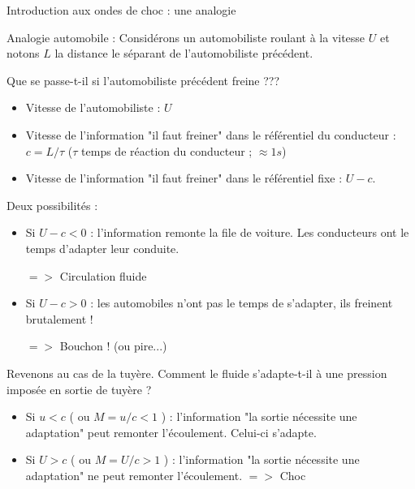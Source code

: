 \begin{frame}{Introduction aux ondes de choc : une analogie}

\small

Analogie automobile :
 \smallskip
Considérons un automobiliste roulant à la vitesse $U$ et notons  $L$ la distance le séparant de l'automobiliste précédent.

 \smallskip
Que se passe-t-il si l'automobiliste précédent freine  ???

 \pause 
 \smallskip

\begin{itemize}
\item Vitesse de l'automobiliste : $U$

\item Vitesse de l'information "il faut freiner" dans le référentiel du conducteur : $c = L/\tau$ ($\tau$ temps de réaction du conducteur ; $\approx 1 s$)

\item Vitesse de l'information "il faut freiner" dans le référentiel fixe : $U-c$.

\end{itemize}

Deux possibilités :

\begin{itemize}
\item Si $U-c<0$ : l'information remonte la file de voiture. Les conducteurs ont le temps d'adapter leur conduite.

$=>$ Circulation fluide 

\pause
\item Si $U-c>0$ : les automobiles n'ont pas le temps de s'adapter, ils freinent brutalement !

$=>$ Bouchon ! (ou pire...)

\end{itemize}

\pause


Revenons au cas de la tuyère. Comment le fluide s'adapte-t-il à une pression imposée en sortie de tuyère ?
\pause
\begin{itemize}
\item Si $u<c$ ( ou $M = u/c <1$ ) : l'information "la sortie nécessite une adaptation" peut remonter l'écoulement. Celui-ci s'adapte.
\pause
\item Si $U>c$ ( ou $M = U/c >1$ ) :  l'information "la sortie nécessite une adaptation" ne peut remonter l'écoulement.
\pause
$=>$ Choc

\end{itemize}
\end{frame}

